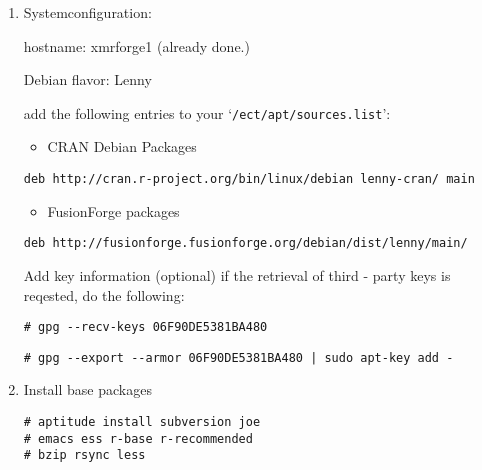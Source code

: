 \documentclass[a4paper]{article}
\let\code=\texttt
\newcommand{\class}[1]{`\code{#1}'}
\let\file=\class
\begin{document}
\begin{enumerate}
\item Systemconfiguration:
	
hostname: xmrforge1 (already done.)
\par Debian flavor: Lenny	

add the following entries to your \file{/ect/apt/sources.list}:	
\begin{itemize}
\item CRAN Debian Packages 
\end{itemize}
\begin{lstlisting}[frame=single, framerule=0.95pt]
deb http://cran.r-project.org/bin/linux/debian lenny-cran/ main
\end{lstlisting}
\begin{itemize}
\item FusionForge packages
\end{itemize}
\medskip
{}
\begin{lstlisting}[frame=single, framerule=0.95pt]
deb http://fusionforge.fusionforge.org/debian/dist/lenny/main/
\end{lstlisting}

Add key information (optional) if the retrieval of third - party keys
is reqested, do the following:

\medskip
{}
\begin{lstlisting}[frame=single, framerule=0.95pt]
# gpg --recv-keys 06F90DE5381BA480
\end{lstlisting}
\medskip

\begin{lstlisting}[frame=single, framerule=0.95pt]
# gpg --export --armor 06F90DE5381BA480 | sudo apt-key add -
\end{lstlisting}


	\item Install base packages

\begin{lstlisting}[frame=single, framerule=0.95pt]
# aptitude install subversion joe
# emacs ess r-base r-recommended 
# bzip rsync less
\end{lstlisting}


\end{enumerate}
\end{document}
